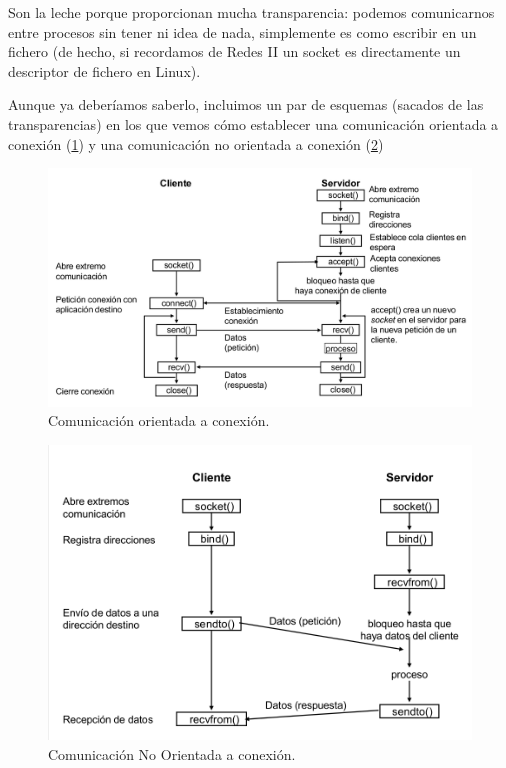 Son la leche porque proporcionan mucha transparencia: podemos comunicarnos entre procesos sin tener ni idea de nada, simplemente es como escribir en un fichero (de hecho, si recordamos de Redes II un socket es directamente un descriptor de fichero en Linux).

Aunque ya deberíamos saberlo, incluimos un par de esquemas (sacados de las transparencias) en los que vemos cómo establecer una comunicación orientada a conexión (\ref{SocketConexion}) y una comunicación no orientada a conexión (\ref{SocketNoConexion})


\begin{figure}[hbtp]
\centering
\includegraphics[width=1\textwidth]{img/SocketConexion.png}
\caption{Comunicación orientada a conexión.}
\label{SocketConexion}
\end{figure}

\begin{figure}[hbtp]
\centering
\includegraphics[width=1\textwidth]{img/SocketNoConexion.png}
\caption{Comunicación No Orientada a conexión.}
\label{SocketNoConexion}
\end{figure}
\newpage

